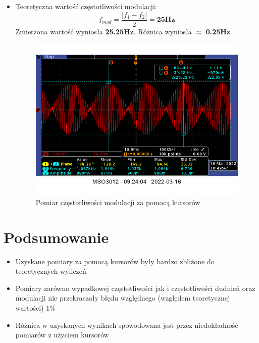 \begin{itemize}
    \item Teoretyczna wartość częstotliwości modulacji:
    \begin{equation}
        f_{mod} = \frac{|f_1 - f_2|}{2} = \textbf{25Hz}
    \end{equation}
    Zmierzona wartość wyniosła \textbf{25.25Hz}. Różnica wyniosła $\approx$ \textbf{0.25Hz}
    \begin{figure}[h]
        \centering
        \includegraphics[scale=0.33]{images/1_6-okresmodulacji.png}
        \caption{Pomiar częstotliwości modulacji za pomocą kursorów}
        \label{fig:cz_modulacji}
    \end{figure}
\end{itemize}

\section {Podsumowanie}

\begin{itemize}
    \item Uzyskane pomiary za pomocą kursorów były bardzo zbliżone do teoretycznych wyliczeń
    \item Pomiary zarówno wypadkowej częstotliwości jak i częstotliwości dudnień oraz modulacji nie przekraczały błędu względnego (względem teoretycznej wartości) 1\%
    \item Różnica w uzyskanych wynikach spowodowana jest przez niedokładność pomiarów z użyciem kursorów
\end{itemize}